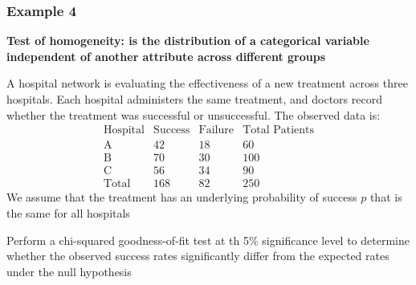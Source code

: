 \documentclass[t,8pt]{beamer}%
\begin{document}
\begin{frame}
    \frametitle{Example 4}
    {\bf Test of homogeneity: is the distribution of a categorical variable independent of another attribute across different groups} \par 
    A hospital network is evaluating the effectiveness of a new treatment across three hospitals. Each hospital administers the same treatment, and doctors record whether the treatment was successful or unsuccessful. The observed data is:
\[
\begin{array}{c|cc|c}
\text{Hospital} & \text{Success} & \text{Failure} & \text{Total Patients} \\
\hline
\text{A} & 42 & 18 & 60 \\
\text{B} & 70 & 30 & 100 \\
\text{C} & 56 & 34 & 90 \\
\hline
\text{Total} & 168 & 82 & 250
\end{array}
\]
We assume that the treatment has an underlying probability of success \( p \) that is the same for all hospitals \par
Perform a chi-squared goodness-of-fit test at th 5\% significance level to determine whether the observed success rates significantly differ from the expected rates under the null hypothesis \par
\end{frame}
\end{document}
